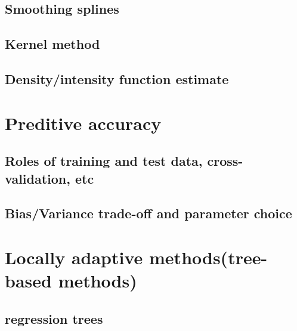 \documentclass[10pt]{article}
\theoremstyle{break}
\begin{document}
    \subsection{Smoothing splines}
    \subsection{Kernel method}
    \subsection{Density/intensity function estimate}
\section{Preditive accuracy}
    \subsection{Roles of training and test data, cross-validation, etc}
    \subsection{Bias/Variance trade-off and parameter choice}
\section{Locally adaptive methods(tree-based methods)}
    \subsection{regression trees}
\end{document}
